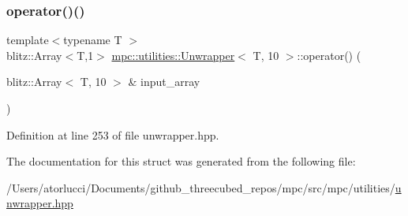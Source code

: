 \subsubsection{\texorpdfstring{operator()()}{operator()()}}
{\footnotesize\ttfamily template$<$typename T $>$ \\
blitz\+::\+Array$<$T,1$>$ \mbox{\hyperlink{structmpc_1_1utilities_1_1_unwrapper}{mpc\+::utilities\+::\+Unwrapper}}$<$ T, 10 $>$\+::operator() (\begin{DoxyParamCaption}\item[{blitz\+::\+Array$<$ T, 10 $>$ \&}]{input\+\_\+array }\end{DoxyParamCaption})\hspace{0.3cm}{\ttfamily [inline]}}



Definition at line 253 of file unwrapper.\+hpp.



The documentation for this struct was generated from the following file\+:\begin{DoxyCompactItemize}
\item 
/\+Users/atorlucci/\+Documents/github\+\_\+threecubed\+\_\+repos/mpc/src/mpc/utilities/\mbox{\hyperlink{unwrapper_8hpp}{unwrapper.\+hpp}}\end{DoxyCompactItemize}
